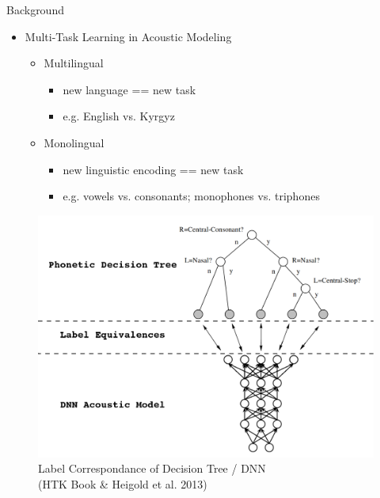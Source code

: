 \documentclass[final]{beamer} %
\begin{document}
\begin{frame}
\begin{columns}
\begin{column}{0.3\textwidth}
{        \vfill
        
        \begin{block}{\boxnumber Background}
          \begin{itemize}
          \item Multi-Task Learning in Acoustic Modeling
            \begin{itemize}
            \item Multilingual
              \begin{itemize}
              \item new language == new task
                \item e.g. English vs. Kyrgyz
              \end{itemize}
            \item Monolingual
              \begin{itemize}
              \item new linguistic encoding == new task
              \item e.g. vowels vs. consonants; monophones vs. triphones
              \end{itemize}
            \end{itemize}     
          \end{itemize}
        \end{block}

        \vfill

        \begin{figure}[!htbp]
          \centering
          \minipage{\textwidth}
          \centering
          \includegraphics[width=\linewidth]{figs/tree-net.png}
          \caption{Label Correspondance of Decision Tree / DNN \\ \hspace{5cm} (HTK Book \& Heigold et al. 2013)}
          \label{fig:mtl-dnn}
          \endminipage\hfill
        \end{figure}

}
\end{column}
\end{columns}
\end{frame}
\end{document}
